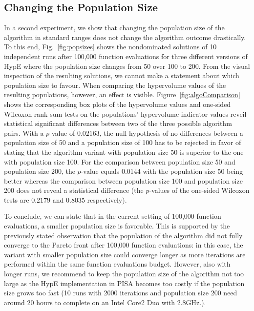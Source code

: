 \documentclass[preprint,12pt]{elsarticle}
\begin{document}
\subsection{Changing the Population Size}
In a second experiment, we show that changing the population size of the algorithm in standard ranges does not change the algorithm outcome drastically. To this end, Fig.~\ref{fig:popsizes} shows the nondominated solutions of 10 independent runs after 100,000 function evaluations for three different versions of HypE where the population size changes from 50 over 100 to 200. From the visual inspection of the resulting solutions, we cannot make a statement about which population size to favour. When comparing the hypervolume values of the resulting populations, however, an effect is visible. Figure~\ref{fig:algoComparison} shows the corresponding box plots of the hypervolume values and one-sided Wilcoxon rank sum tests on the populations' hypervolume indicator values reveil statistical significant differences between two of the three possible algorithm pairs. With a $p$-value of $0.02163$, the null hypothesis of no differences between a population size of 50 and a population size of 100 has to be rejected in favor of stating that the algorithm variant with population size 50 is superior to the one with population size 100. For the comparison between population size 50 and population size 200, the $p$-value equals $0.0144$ with the population size 50 being better whereas the comparison between population size 100 and population size 200 does not reveal a statistical difference (the $p$-values of the one-sided Wilcoxon tests are $0.2179$ and $0.8035$ respectively).

To conclude, we can state that in the current setting of 100,000 function evaluations, a smaller population size is favorable. This is supported by the previously stated observation that the population of the algorithm did not fully converge to the Pareto front after 100,000 function evaluations: in this case, the variant with smaller population size could converge longer as more iterations are performed within the same function evaluations budget. However, also with longer runs, we recommend to keep the population size of the algorithm not too large as the HypE implementation in PISA becomes too costly if the population size grows too fast (10 runs with 2000 iterations and population size 200 need around 20 hours to complete on an Intel Core2 Duo with 2.8GHz.).
\end{document}
